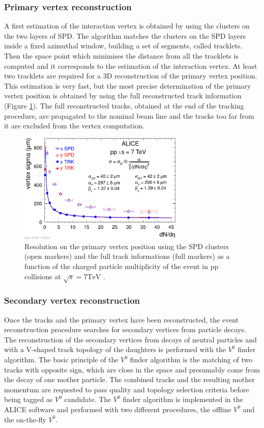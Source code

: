\subsubsection{Primary vertex reconstruction}
A first estimation of the interaction vertex is obtained by using the clusters on the two layers of 
SPD. The algorithm matches the clusters on the SPD layers inside a fixed azimuthal window,
building a set of segments, called tracklets.
Then the space point which minimises the distance from all the tracklets is computed and it corresponds to the estimation of
the interaction vertex.
At least two tracklets are required for a 3D reconstruction of the primary vertex position.
This estimation is very fast, but the most precise determination of the primary vertex position is 
obtained by using the full reconstructed track information (Figure \ref{fig:vertres}).
The full reconstructed tracks, obtained at the end of the tracking procedure, are propagated to the
nominal beam line and the tracks too far from it are excluded from the vertex computation.

\begin{figure}
    \centering
    \includegraphics[width=0.7\textwidth]{gfx/vertexres}
	\caption{Resolution on the primary vertex position using the SPD clusters (open markers) and the full track informations (full markers) as a function of the charged particle multiplicity of the event in pp collisions at $\sqrt{s} = 7 \mathrm{TeV}$ \cite{alicemulti}.}
	\label{fig:vertres}
\end{figure}

\subsubsection{Secondary vertex reconstruction}
Once the tracks and the primary vertex have been reconstructed, the event reconstruction procedure
searches for secondary vertices from particle decays.
The reconstruction of the secondary vertices from decays of neutral particles and with a V-shaped track 
topology of the daughters is performed with the $V^{0}$ finder algorithm.
The basic principle of the $V^{0}$ finder algorithm is the matching of two tracks with opposite sign,
which are close in the space and presumably come from the decay of one mother particle.
The combined tracks and the resulting mother momentum are requested to pass quality and topology selection criteria
before being tagged as $V^{0}$ candidate.
The $V^{0}$ finder algorithm is implemented in the ALICE software and performed with two different
procedures, the offline $V^{0}$ and the on-the-fly $V^{0}$.

